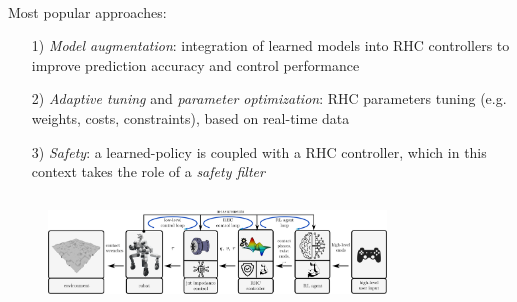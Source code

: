 \begin{columns}[t]
	\vspace{0.5cm}
	\begin{Large}
	\begin{column}{0.4\textwidth}
		\vskip0.5cm \\
		Most popular approaches:
		\begin{itemize}
			\item[1)] \textit{Model augmentation}: integration of learned models into RHC controllers to improve prediction accuracy and control performance
			\item[2)] \textit{Adaptive tuning} and \textit{parameter optimization}: RHC parameters tuning (e.g. weights, costs, constraints), based on real-time data
			\item[3)] \textit{Safety}: a learned-policy is coupled with a RHC controller, which in this context takes the role of a \textit{safety filter}
		\end{itemize}

	\end{column}

	\begin{column}{0.6\textwidth}
		\begin{figure}[h]
			\includegraphics[width=0.8\textwidth]{docs/imgs/approach.png}
		\end{figure}
		\vspace{5cm}
		
	\end{column}
	\end{Large}
\end{columns}